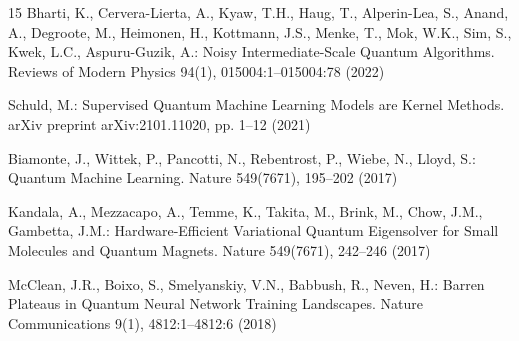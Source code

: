 \documentclass{llncs}
\begin{document}
\begin{thebibliography}{15}
Bharti, K., Cervera-Lierta, A., Kyaw, T.H., Haug, T., Alperin-Lea, S., Anand, A., Degroote, M., Heimonen, H., Kottmann, J.S., Menke, T., Mok, W.K., Sim, S., Kwek, L.C., Aspuru-Guzik, A.: Noisy Intermediate-Scale Quantum Algorithms. Reviews of Modern Physics 94(1), 015004:1--015004:78 (2022)

Schuld, M.: Supervised Quantum Machine Learning Models are Kernel Methods. arXiv preprint arXiv:2101.11020, pp. 1--12 (2021)

Biamonte, J., Wittek, P., Pancotti, N., Rebentrost, P., Wiebe, N., Lloyd, S.: Quantum Machine Learning. Nature 549(7671), 195--202 (2017)

Kandala, A., Mezzacapo, A., Temme, K., Takita, M., Brink, M., Chow, J.M., Gambetta, J.M.: Hardware-Efficient Variational Quantum Eigensolver for Small Molecules and Quantum Magnets. Nature 549(7671), 242--246 (2017)

McClean, J.R., Boixo, S., Smelyanskiy, V.N., Babbush, R., Neven, H.: Barren Plateaus in Quantum Neural Network Training Landscapes. Nature Communications 9(1), 4812:1--4812:6 (2018)

\end{thebibliography}
\end{document}
